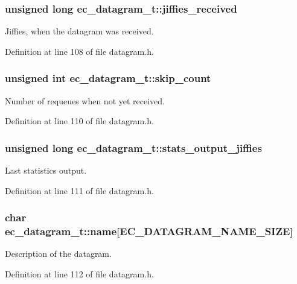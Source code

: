 \subsubsection[{jiffies\-\_\-received}]{\setlength{\rightskip}{0pt plus 5cm}unsigned long {\bf ec\-\_\-datagram\-\_\-t\-::jiffies\-\_\-received}}\label{structec__datagram__t_a3a643445750ee67fa83d182eb720380e}


\-Jiffies, when the datagram was received. 



\-Definition at line 108 of file datagram.\-h.

\subsubsection[{skip\-\_\-count}]{\setlength{\rightskip}{0pt plus 5cm}unsigned int {\bf ec\-\_\-datagram\-\_\-t\-::skip\-\_\-count}}\label{structec__datagram__t_af7007d254b40111c064caaac6f9c4f81}


\-Number of requeues when not yet received. 



\-Definition at line 110 of file datagram.\-h.

\subsubsection[{stats\-\_\-output\-\_\-jiffies}]{\setlength{\rightskip}{0pt plus 5cm}unsigned long {\bf ec\-\_\-datagram\-\_\-t\-::stats\-\_\-output\-\_\-jiffies}}\label{structec__datagram__t_a9a6c9216d340b19a47e802ce89fbb269}


\-Last statistics output. 



\-Definition at line 111 of file datagram.\-h.

\subsubsection[{name}]{\setlength{\rightskip}{0pt plus 5cm}char {\bf ec\-\_\-datagram\-\_\-t\-::name}[{\bf \-E\-C\-\_\-\-D\-A\-T\-A\-G\-R\-A\-M\-\_\-\-N\-A\-M\-E\-\_\-\-S\-I\-Z\-E}]}\label{structec__datagram__t_af2690854e7fb1c410aa37a1ed225836d}


\-Description of the datagram. 



\-Definition at line 112 of file datagram.\-h.

